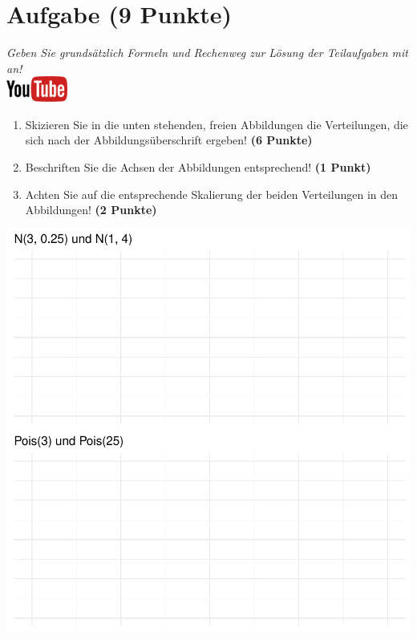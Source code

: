 \documentclass[a4paper, 9pt]{scrartcl}\usepackage[]{graphicx}\usepackage[]{xcolor}
\makeatletter
\def\maxwidth{ %
  \ifdim\Gin@nat@width>\linewidth
    \linewidth
  \else
    \Gin@nat@width
  \fi
}
\makeatother
\begin{document}
 
\clearpage

\section{Aufgabe \hfill (9 Punkte)}

\textit{Geben Sie grunds{\"a}tzlich Formeln und Rechenweg zur L{\"o}sung der
  Teilaufgaben mit an!} \\[1Ex]

\hfill\href{https://youtu.be/MiD42k4l5Ag}{\includegraphics[width =
  2cm]{img/youtube}}\\[1Ex]



\begin{enumerate}
\item Skizieren Sie in die unten stehenden, freien Abbildungen die
  Verteilungen, die sich nach der Abbildungs{\"u}berschrift ergeben! \textbf{(6
    Punkte)}
\item Beschriften Sie die Achsen der Abbildungen entsprechend! \textbf{(1
    Punkt)}
\item Achten Sie auf die entsprechende Skalierung der beiden Verteilungen
  in den Abbildungen! \textbf{(2 Punkte)}
\end{enumerate}



{\centering \includegraphics[width=\maxwidth]{img/histogram-01-1} 

}
\end{document}
